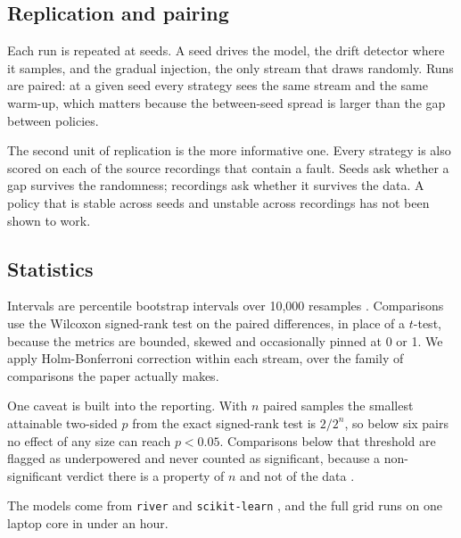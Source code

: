 \documentclass[11pt,a4paper]{article}
\begin{document}
\subsection{Replication and pairing}

Each run is repeated at \NSeeds{} seeds. A seed drives the model, the drift
detector where it samples, and the gradual injection, the only stream that draws
randomly. Runs are paired: at a given seed every strategy sees the same stream
and the same warm-up, which matters because the between-seed spread is larger
than the gap between policies.

The second unit of replication is the more informative one. Every strategy is
also scored on each of the \NRecordings{} source recordings that contain a
fault. Seeds ask whether a gap survives the randomness; recordings ask whether
it survives the data. A policy that is stable across seeds and unstable across
recordings has not been shown to work.

\subsection{Statistics}

Intervals are percentile bootstrap intervals over 10{,}000 resamples
\citep{efron1979bootstrap}. Comparisons use the Wilcoxon signed-rank test
\citep{wilcoxon1945} on the paired differences, in place of a $t$-test, because
the metrics are bounded, skewed and occasionally pinned at 0 or 1. We apply
Holm-Bonferroni correction \citep{holm1979sequential} within each stream, over
the family of comparisons the paper actually makes.

One caveat is built into the reporting. With $n$ paired samples the smallest
attainable two-sided $p$ from the exact signed-rank test is $2/2^n$, so below six
pairs no effect of any size can reach $p<0.05$. Comparisons below that threshold
are flagged as underpowered and never counted as significant, because a
non-significant verdict there is a property of $n$ and not of the data
\citep{demsar2006statistical}.

The models come from \texttt{river} \citep{montiel2021river} and
\texttt{scikit-learn} \citep{pedregosa2011sklearn}, and the full grid runs on one
laptop core in under an hour.






\end{document}

